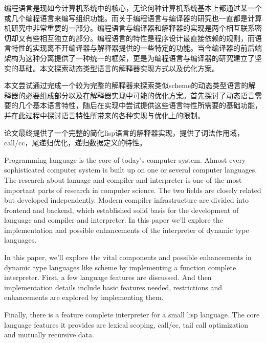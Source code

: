
\begin{cabstract}
编程语言是现如今计算机系统中的核心，无论何种计算机系统基本上都通过某一个或几个编程语言来编写组织功能。而关于编程语言与编译器的研究也一直都是计算机研究中非常重要的一部分。编程语言与编译器和解释器的实现是两个相互联系密切却又有些相互独立的部分。编程语言的特性是程序设计最直接依赖的规则，而语言特性的实现离不开编译器与解释器提供的一些特定的功能。当今编译器的前后端架构为这种分离提供了一种统一的框架，更是为编程语言与编译器的研究建立了坚实的基础。本文探索动态类型语言的解释器实现方式以及优化方案。

本文尝试通过完成一个较为完整的解释器来探索类似scheme的动态类型语言的解释器的必要组成部分以及在解释器实现中可能的优化方案。首先探讨了动态语言需要的几个基本语言特性，随后在实现中尝试提供这些语言特性所需要的基础功能，并在此过程中探讨语言特性所带来的各种实现与优化上的限制。

论文最终提供了一个完整的简化lisp语言的解释器实现，提供了词法作用域，call/cc，尾递归优化，递归数据定义的特性。
\end{cabstract}

\begin{eabstract}
Programming language is the core of today's computer system. Almost every sophisticated computer system is built up on one or several computer languages. The research about lanuage and compiler and interpreter is one of the most important parts of research in computer science. The two fields are closely related but developed independently. Modern compiler infrastructure are divided into frontend and backend, which established solid basis for the development of language and compiler and interpreter. In this paper we'll explore the implementation and possible enhancements of the interpreter of dynamic type languages.

In this paper, we'll explore the vital components and possible enhancements in dynamic type languages like scheme by implementing a function complete interpreter. First, a few language features are discussed. And then implementation details include basic features needed, restrictions and enhancements are explored by implementing them.

Finally, there is a feature complete interpreter for a small lisp language. The core language features it provides are lexical scoping, call/cc, tail call optimization and mutually recursive data.
\end{eabstract}
